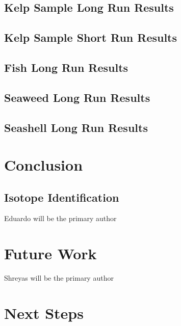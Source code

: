 \documentclass[]{article}
\begin{document}
\subsection{Kelp Sample Long Run Results}

\subsection{Kelp Sample Short Run Results}

\subsection{Fish Long Run Results}

\subsection{Seaweed Long Run Results}

\subsection{Seashell Long Run Results}

\section{Conclusion}
\subsection{Isotope Identification}
Eduardo will be the primary author

\section{Future Work}
Shreyas will be the primary author


\section{Next Steps}
  
\end{document}
